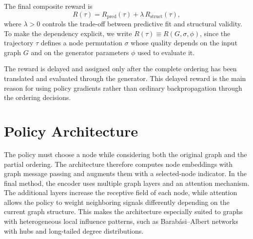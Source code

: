 The final composite reward is
\begin{equation}
    R(\tau) = R_{\mathrm{pred}}(\tau) + \lambda\,R_{\mathrm{struct}}(\tau),
    \label{eq:reward-composite}
\end{equation}
where $\lambda>0$ controls the trade-off between predictive fit and structural validity. To make the dependency explicit, we write $R(\tau)\equiv R(G,\sigma,\phi)$, since the trajectory $\tau$ defines a node permutation $\sigma$ whose quality depends on the input graph $G$ and on the generator parameters $\phi$ used to evaluate it.

The reward is delayed and assigned only after the complete ordering has been translated and evaluated through the generator. This delayed reward is the main reason for using policy gradients rather than ordinary backpropagation through the ordering decisions.

\section{Policy Architecture}
\label{sec:rl-policy-architecture}

The policy must choose a node while considering both the original graph and the partial ordering. The architecture therefore computes node embeddings with graph message passing and augments them with a selected-node indicator. In the final method, the encoder uses multiple graph layers and an attention mechanism. The additional layers increase the receptive field of each node, while attention allows the policy to weight neighboring signals differently depending on the current graph structure. This makes the architecture especially suited to graphs with heterogeneous local influence patterns, such as Barab\'asi--Albert networks with hubs and long-tailed degree distributions.

